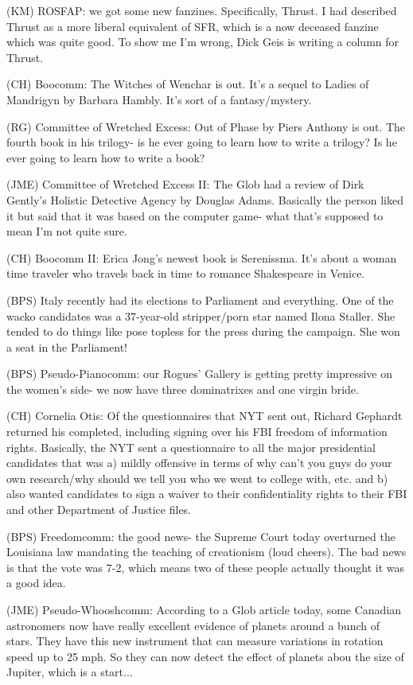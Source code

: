 \documentclass[12pt]{article}
\begin{document}
(KM) ROSFAP: we got some new fanzines. Specifically, Thrust. I had described Thrust as a more liberal equivalent of SFR, which is a now deceased fanzine which was quite good. To show me I'm wrong, Dick Geis is writing a column for Thrust.

(CH) Boocomm: The Witches of Wenchar is out. It's a sequel to Ladies of Mandrigyn by Barbara Hambly. It's sort of a fantasy/mystery.

(RG) Committee of Wretched Excess: Out of Phase by Piers Anthony is out. The fourth book in his trilogy- is he ever going to learn how to write a trilogy? Is he ever going to learn how to write a book?

(JME) Committee of Wretched Excess II: The Glob had a review of Dirk Gently's Holistic Detective Agency by Douglas Adams. Basically the person liked it but said that it was based on the computer game- what that's supposed to mean I'm not quite sure.

(CH) Boocomm II: Erica Jong's newest book is Serenissma. It's about a woman time traveler who travels back in time to romance Shakespeare in Venice.

(BPS) Italy recently had its elections to Parliament and everything. One of the wacko candidates was a 37-year-old stripper/porn star named Ilona Staller. She tended to do things like pose topless for the press during the campaign. She won a seat in the Parliament!

(BPS) Pseudo-Pianocomm: our Rogues' Gallery is getting pretty impressive on the women's side- we now have three dominatrixes and one virgin bride.

(CH) Cornelia Otis: Of the questionnaires that NYT sent out, Richard Gephardt returned his completed, including signing over his FBI freedom of information rights. Basically, the NYT sent a questionnaire to all the major presidential candidates that was a) mildly offensive in terms of why can't you guys do your own research/why should we tell you who we went to college with, etc. and b) also wanted candidates to sign a waiver to their confidentiality rights to their FBI and other Department of Justice files.

(BPS) Freedomcomm: the good news- the Supreme Court today overturned the Louisiana law mandating the teaching of creationism (loud cheers). The bad news is that the vote was 7-2, which means two of these people actually thought it was a good idea.

(JME) Pseudo-Whooshcomm: According to a Glob article today, some Canadian astronomers now have really excellent evidence of planets around a bunch of stars. They have this new instrument that can measure variations in rotation speed up to 25 mph. So they can now detect the effect of planets abou the size of Jupiter, which is a start...
\end{document}
